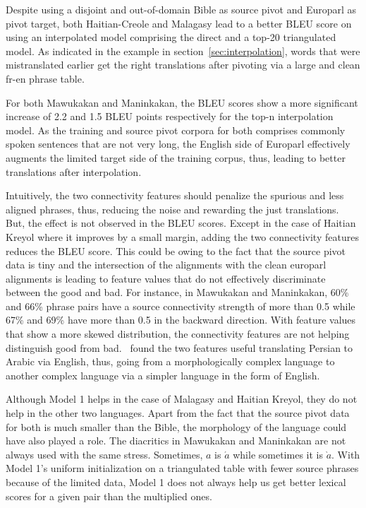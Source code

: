 Despite using a disjoint and out-of-domain Bible as source pivot and Europarl as pivot target, both Haitian-Creole and Malagasy lead to a better BLEU score on using an interpolated model comprising the direct and a top-20 triangulated model. As indicated in the example in section~\ref{sec:interpolation}, words that were mistranslated earlier get the right translations after pivoting via a large and clean fr-en phrase table.

For both Mawukakan and Maninkakan, the BLEU scores show a more significant increase of 2.2 and 1.5 BLEU points respectively for the top-n interpolation model. As the training and source pivot corpora for both comprises commonly spoken sentences that are not very long, the English side of Europarl effectively augments the limited target side of the training corpus, thus, leading to better translations after interpolation.

Intuitively, the two connectivity features should penalize the spurious and less aligned phrases, thus, reducing the noise and rewarding the just translations. But, the effect is not observed in the BLEU scores. Except in the case of Haitian Kreyol where it improves by a small margin, adding the two connectivity features reduces the BLEU score. This could be owing to the fact that the source pivot data is tiny and the intersection of the alignments with the clean europarl alignments is leading to feature values that do not effectively discriminate between the good and bad. For instance, in Mawukakan and Maninkakan, 60\% and 66\% phrase pairs have a source connectivity strength of more than 0.5 while 67\% and 69\% have more than 0.5 in the backward direction. With feature values that show a more skewed distribution, the connectivity features are not helping distinguish good from bad.~\cite{Ahmed:13} found the two features useful translating Persian to Arabic via English, thus, going from a morphologically complex language to another complex language via a simpler language in the form of English.

Although Model 1 helps in the case of Malagasy and Haitian Kreyol, they do not help in the other two languages. Apart from the fact that the source pivot data for both is much smaller than the Bible, the morphology of the language could have also played a role. The diacritics in Mawukakan and Maninkakan are not always used with the same stress. Sometimes, $a$ is $\acute{a}$ while sometimes it is $\grave{a}$. With Model 1's uniform initialization on a triangulated table with fewer source phrases because of the limited data, Model 1 does not always help us get better lexical scores for a given pair than the multiplied ones.

